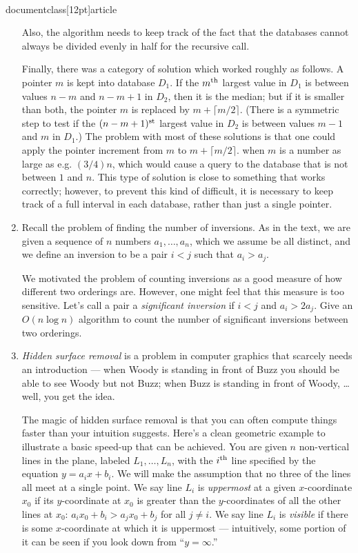\\documentclass[12pt]{article}
\begin{document}
\begin{enumerate}
{Also, the algorithm needs to keep track of the fact that
the databases cannot always be divided evenly in half
for the recursive call.

Finally, there was a category of solution which worked
roughly as follows.  A pointer $m$ is kept into database $D_1$.
If the $m^{\rm th}$ largest value in $D_1$ is between values
$n-m$ and $n-m+1$ in $D_2$, then it is the median;
but if it is smaller than both, the pointer $m$ is replaced by 
$m + \lceil m/2 \rceil$.
(There is a symmetric step to test if the $(n-m+1)^{\rm st}$
largest value in $D_2$ is between values $m-1$ and $m$ in $D_1$.)
The problem with most of these solutions is that one could
apply the pointer increment from $m$ to $m + \lceil m/2 \rceil$.
when $m$ is a number as large as e.g. $(3/4)n$, which would 
cause a query to the database that is not between $1$ and $n$.
This type of solution is close to something that works correctly;
however, to prevent this kind of difficult,
it is necessary to keep track of a full interval in
each database, rather than just a single pointer.

}


\item 

Recall the problem of finding the number of inversions. As in the
text, we are given a sequence of $n$ numbers $a_1, \ldots, a_n$, which
we assume be all distinct, and we define an 
inversion to be a pair $i<j$ such that $a_i > a_j$. 

We motivated the problem of 
counting inversions as a good measure of how different two orderings are. 
However, one might feel that this measure is
too sensitive. Let's call a pair a {\em significant inversion} if
$i <j$ and  $a_i > 2 a_j$. Give an $O(n\log n)$ algorithm to count
the number of significant inversions between two orderings.



\item\Star
{\em Hidden surface removal} is a problem
in computer graphics that scarcely needs an introduction ---
when Woody is standing in front of Buzz you should be
able to see Woody but not Buzz;
when Buzz is standing in front of Woody, \ldots well, you get the idea.

The magic of hidden surface removal is that you can often
compute things faster than your intuition suggests.
Here's a clean geometric example to illustrate a basic speed-up
that can be achieved.
You are given $n$ non-vertical lines in the plane, labeled $L_1, \ldots, L_n$,
with the $i^{\rm th}$ line specified by the equation
$y = a_i x + b_i$.
We will make the assumption that no three of the lines
all meet at a single point.
We say line $L_i$ is {\em uppermost} at a given $x$-coordinate $x_0$ if
its $y$-coordinate at $x_0$ is greater than the $y$-coordinates
of all the other lines at $x_0$:
$a_i x_0 + b_i > a_j x_0 + b_j$ for all $j \neq i$.
We say line $L_i$ is {\em visible} if there is some $x$-coordinate
at which it is uppermost ---
intuitively, some portion
of it can be seen if you look down from ``$y = \infty$.''


\end{enumerate}
\end{document}
